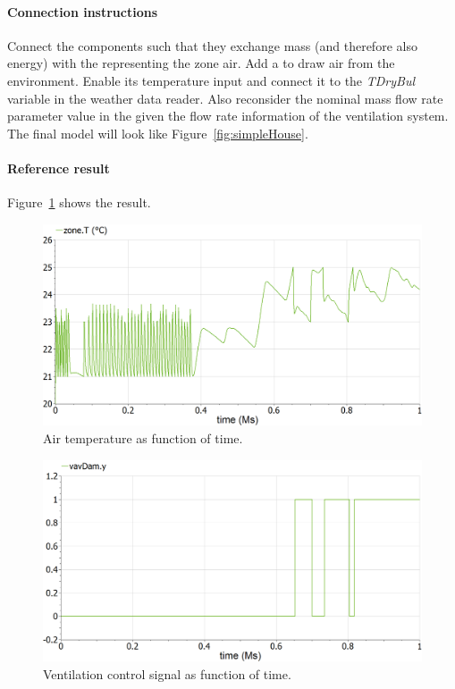 \documentclass[10pt,a4paper]{article}
\begin{document}
\paragraph{Connection instructions}
Connect the components such that they exchange mass (and therefore also energy) with the  representing the zone air. Add a  to draw air from the environment. Enable its temperature input and connect it to the \textit{TDryBul} variable in the weather data reader. Also reconsider the nominal mass flow rate parameter value in the  given the flow rate information of the ventilation system. The final model will look like Figure~\ref{fig:simpleHouse}.

\paragraph{Reference result}
Figure~\ref{fig:res6} shows the result.
\begin{figure}[h]
\centering
\includegraphics[width=0.6\columnwidth]{img/result6.png}
\caption{Air temperature as function of time.}
\label{fig:res6}
\end{figure}
\begin{figure}[h]
	\centering
	\includegraphics[width=0.6\columnwidth]{img/result7.png}
	\caption{Ventilation control signal as function of time.}
	\label{fig:res7}
\end{figure}
\end{document}
